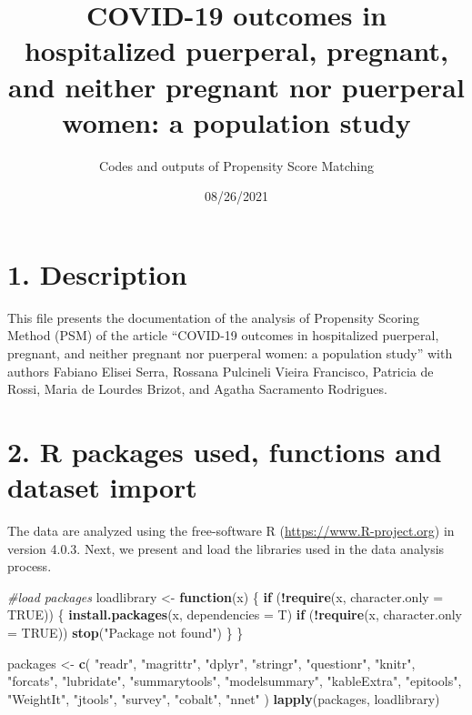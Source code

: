 \documentclass[
]{article}
\title{COVID-19 outcomes in hospitalized puerperal, pregnant, and neither
pregnant nor puerperal women: a population study}
\author{Codes and outputs of Propensity Score Matching}
\date{08/26/2021}
\newenvironment{Shaded}{\begin{snugshade}}{\end{snugshade}}
\newcommand{\CommentTok}[1]{\textcolor[rgb]{0.56,0.35,0.01}{\textit{#1}}}
\newcommand{\ControlFlowTok}[1]{\textcolor[rgb]{0.13,0.29,0.53}{\textbf{#1}}}
\newcommand{\DataTypeTok}[1]{\textcolor[rgb]{0.13,0.29,0.53}{#1}}
\newcommand{\KeywordTok}[1]{\textcolor[rgb]{0.13,0.29,0.53}{\textbf{#1}}}
\newcommand{\NormalTok}[1]{#1}
\newcommand{\OperatorTok}[1]{\textcolor[rgb]{0.81,0.36,0.00}{\textbf{#1}}}
\newcommand{\OtherTok}[1]{\textcolor[rgb]{0.56,0.35,0.01}{#1}}
\newcommand{\StringTok}[1]{\textcolor[rgb]{0.31,0.60,0.02}{#1}}
\begin{document}
\maketitle

\hypertarget{description}{%
\section{1. Description}\label{description}}

This file presents the documentation of the analysis of Propensity
Scoring Method (PSM) of the article ``COVID-19 outcomes in hospitalized
puerperal, pregnant, and neither pregnant nor puerperal women: a
population study'' with authors Fabiano Elisei Serra, Rossana Pulcineli
Vieira Francisco, Patricia de Rossi, Maria de Lourdes Brizot, and Agatha
Sacramento Rodrigues.

\hypertarget{r-packages-used-functions-and-dataset-import}{%
\section{2. R packages used, functions and dataset
import}\label{r-packages-used-functions-and-dataset-import}}

The data are analyzed using the free-software R
(\url{https://www.R-project.org}) in version 4.0.3. Next, we present and
load the libraries used in the data analysis process.

\begin{Shaded}
\begin{Highlighting}[]
\CommentTok{#load packages}
\NormalTok{loadlibrary <-}\StringTok{ }\ControlFlowTok{function}\NormalTok{(x) \{}
  \ControlFlowTok{if}\NormalTok{ (}\OperatorTok{!}\KeywordTok{require}\NormalTok{(x, }\DataTypeTok{character.only =} \OtherTok{TRUE}\NormalTok{)) \{}
    \KeywordTok{install.packages}\NormalTok{(x, }\DataTypeTok{dependencies =}\NormalTok{ T)}
    \ControlFlowTok{if}\NormalTok{ (}\OperatorTok{!}\KeywordTok{require}\NormalTok{(x, }\DataTypeTok{character.only =} \OtherTok{TRUE}\NormalTok{))}
      \KeywordTok{stop}\NormalTok{(}\StringTok{"Package not found"}\NormalTok{)}
\NormalTok{  \}}
\NormalTok{\}}

\NormalTok{packages <-}
\StringTok{  }\KeywordTok{c}\NormalTok{(}
    \StringTok{"readr"}\NormalTok{,}
    \StringTok{"magrittr"}\NormalTok{,}
    \StringTok{"dplyr"}\NormalTok{,}
    \StringTok{"stringr"}\NormalTok{,}
    \StringTok{"questionr"}\NormalTok{,}
    \StringTok{"knitr"}\NormalTok{,}
    \StringTok{"forcats"}\NormalTok{,}
    \StringTok{"lubridate"}\NormalTok{,}
    \StringTok{"summarytools"}\NormalTok{,}
    \StringTok{"modelsummary"}\NormalTok{,}
    \StringTok{"kableExtra"}\NormalTok{,}
    \StringTok{"epitools"}\NormalTok{,}
    \StringTok{"WeightIt"}\NormalTok{,}
    \StringTok{"jtools"}\NormalTok{,}
    \StringTok{"survey"}\NormalTok{,}
    \StringTok{"cobalt"}\NormalTok{,}
    \StringTok{"nnet"}
\NormalTok{  )}
\KeywordTok{lapply}\NormalTok{(packages, loadlibrary)}
\end{Highlighting}
\end{Shaded}
\end{document}
